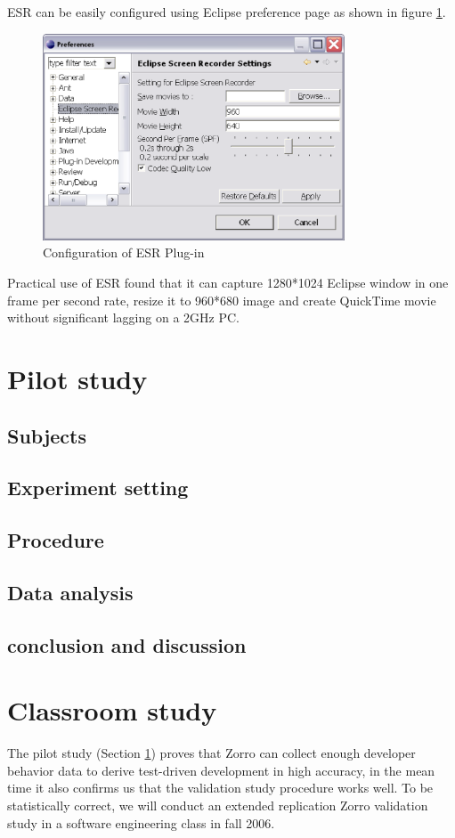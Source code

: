 ESR can be easily configured using Eclipse preference page as shown in
figure \ref{fig:esr-preference}.
\begin{figure}[htbp] 
  \centering
  \includegraphics[width=0.8\textwidth]{figs/esr-preference.eps}
  \caption{Configuration of ESR Plug-in}\label{fig:esr-preference}
\end{figure} 
Practical use of ESR found that it can capture 1280*1024 Eclipse window in
one frame per second rate, resize it to 960*680 image and create QuickTime
movie without significant lagging on a 2GHz PC.

\section{Pilot study}
\label{sec:pilot}
\subsection{Subjects}
\subsection{Experiment setting}
\subsection{Procedure}
\subsection{Data analysis}
\subsection{conclusion and discussion}

\section{Classroom study}
\label{sec:classroom}
The pilot study (Section \ref{sec:pilot}) proves that Zorro can collect
enough developer behavior data to derive test-driven development in high
accuracy, in the mean time it also confirms us that the validation study
procedure works well. To be statistically correct, we will conduct an
extended replication Zorro validation study in a software engineering class
in fall 2006.


